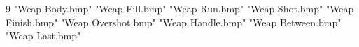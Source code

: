 9
"Weap Body.bmp"
"Weap Fill.bmp"
"Weap Run.bmp"
"Weap Shot.bmp"
"Weap Finish.bmp"
"Weap Overshot.bmp"
"Weap Handle.bmp"
"Weap Between.bmp"
"Weap Last.bmp"